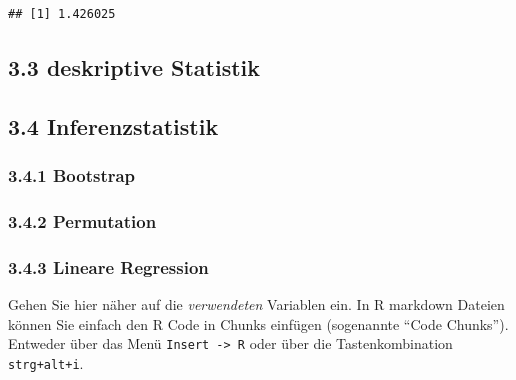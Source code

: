 \documentclass[ngerman,]{article}
\newenvironment{Shaded}{\begin{snugshade}}{\end{snugshade}}
\newcommand{\KeywordTok}[1]{\textcolor[rgb]{0.13,0.29,0.53}{\textbf{#1}}}
\newcommand{\DecValTok}[1]{\textcolor[rgb]{0.00,0.00,0.81}{#1}}
\newcommand{\StringTok}[1]{\textcolor[rgb]{0.31,0.60,0.02}{#1}}
\newcommand{\CommentTok}[1]{\textcolor[rgb]{0.56,0.35,0.01}{\textit{#1}}}
\newcommand{\OperatorTok}[1]{\textcolor[rgb]{0.81,0.36,0.00}{\textbf{#1}}}
\newcommand{\NormalTok}[1]{#1}
\begin{document}
\begin{Shaded}
\end{Shaded}

\begin{verbatim}
## [1] 1.426025
\end{verbatim}

\newpage 

\subsection{3.3 deskriptive Statistik}\label{deskriptive-statistik}

\subsection{3.4 Inferenzstatistik}\label{inferenzstatistik}

\subsubsection{3.4.1 Bootstrap}\label{bootstrap}

\subsubsection{3.4.2 Permutation}\label{permutation}

\subsubsection{3.4.3 Lineare Regression}\label{lineare-regression}

Gehen Sie hier näher auf die \emph{verwendeten} Variablen ein. In R
markdown Dateien können Sie einfach den R Code in Chunks einfügen
(sogenannte ``Code Chunks''). Entweder über das Menü
\texttt{Insert\ -\textgreater{}\ R} oder über die Tastenkombination
\texttt{strg+alt+i}.
\end{document}
